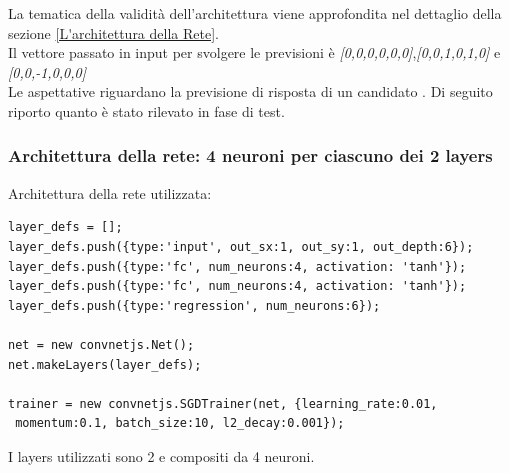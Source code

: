\noindent
La tematica della validit\`a dell'architettura viene approfondita nel dettaglio della sezione \ref{L'architettura della Rete}.\\
\noindent
Il vettore passato in input per svolgere le previsioni \`e \textit{[0,0,0,0,0,0]},\textit{[0,0,1,0,1,0]} e \textit{[0,0,-1,0,0,0]}\\
Le aspettative riguardano la previsione di risposta di un candidato
\noindent. 
Di seguito riporto quanto \`e stato rilevato in fase di test.

\subsubsection{Architettura  della rete: 4 neuroni per ciascuno dei 2 layers}
\label{Configurazione della rete: 4 neuroni per ciascuno dei 2 layers}

Architettura  della rete utilizzata:\\
\begin{verbatim}layer_defs = [];
layer_defs.push({type:'input', out_sx:1, out_sy:1, out_depth:6});
layer_defs.push({type:'fc', num_neurons:4, activation: 'tanh'});
layer_defs.push({type:'fc', num_neurons:4, activation: 'tanh'});
layer_defs.push({type:'regression', num_neurons:6});

net = new convnetjs.Net();
net.makeLayers(layer_defs);

trainer = new convnetjs.SGDTrainer(net, {learning_rate:0.01,
 momentum:0.1, batch_size:10, l2_decay:0.001});
\end{verbatim}
\noindent
I layers utilizzati sono 2 e compositi da 4 neuroni.

